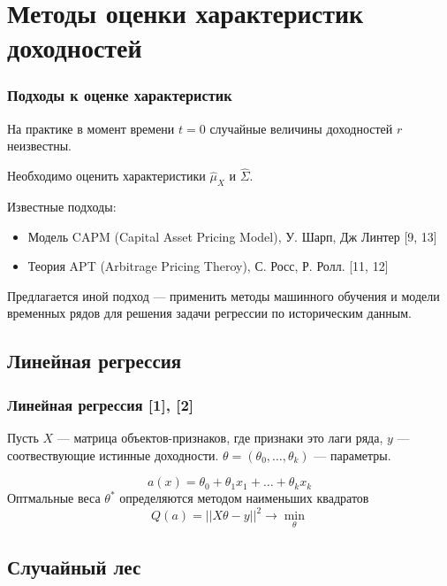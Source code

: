 \documentclass{beamer}
\begin{document}

\section{Методы оценки характеристик доходностей}

\begin{frame}
    \frametitle{Подходы к оценке характеристик}

    На практике в момент времени $t=0$ случайные величины доходностей $r$ неизвестны.
    
    Необходимо оценить характеристики $\hat{\mu}_X$ и $\hat{\Sigma}$.

    Известные подходы:
    \begin{itemize}
        \item Модель CAPM (Capital Asset Pricing Model), У. Шарп, Дж Линтер [9, 13]
        \item Теория  APT (Arbitrage Pricing Theroy), С. Росс, Р. Ролл. [11, 12]
    \end{itemize}
    
    Предлагается иной подход --- применить методы машинного обучения и модели временных
    рядов для решения задачи регрессии по историческим данным.
\end{frame}

\subsection{Линейная регрессия}

\begin{frame}
    \frametitle{Линейная регрессия [1], [2]}
    Пусть $X$ --- матрица объектов-признаков, где признаки это лаги ряда,
    $y$ --- соотвествующие истинные доходности.
    $\theta = (\theta_0, \dots, \theta_k)$ --- параметры.
    
    \[
        a(x) = \theta_0 + \theta_1 x_1 + \dots + \theta_k x_k
    \]
    Оптмальные веса $\theta^*$ определяются методом наименьших квадратов
    \[
        Q(a) = || X\theta - y||^2 \rightarrow \min_{\theta}
    \]
\end{frame}

\subsection{Случайный лес}
\end{document}
